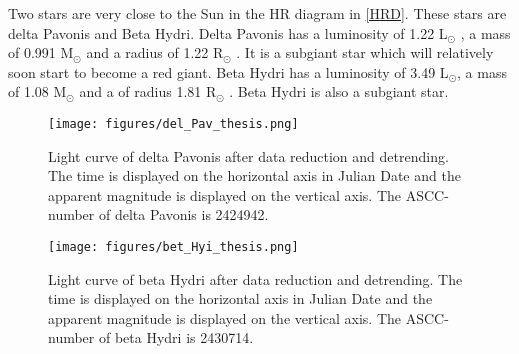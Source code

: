 \documentclass{aa}
\begin{document}


Two stars are very close to the Sun in the HR diagram in \ref{HRD}. These stars are delta Pavonis and Beta Hydri. Delta Pavonis has a luminosity of 1.22 L$_\odot$ \citep{Bruntt_2010}, a mass of 0.991 M$_\odot$ and a radius of 1.22 R$_\odot$ \citep{2008yCat..21680297T}. It is a subgiant star which will relatively soon start to become a red giant. Beta Hydri has a luminosity of 3.49 L$_\odot$, a mass of 1.08 M$_\odot$ and a of radius 1.81 R$_\odot$ \citep{Brand_o_2011}. Beta Hydri is also a subgiant star. 

\begin{figure}
    \centering
    \texttt{[image: figures/del\_Pav\_thesis.png]}
    \caption{Light curve of delta Pavonis after data reduction and detrending. The time is displayed on the horizontal axis in Julian Date and the apparent magnitude is displayed on the vertical axis. The ASCC-number of delta Pavonis is 2424942.}
    \label{del_Pav}
\end{figure}

\begin{figure}
    \centering
    \texttt{[image: figures/bet\_Hyi\_thesis.png]}
    \caption{Light curve of beta Hydri after data reduction and detrending. The time is displayed on the horizontal axis in Julian Date and the apparent magnitude is displayed on the vertical axis. The ASCC-number of beta Hydri is 2430714.}
    \label{bet_Hyi}
  \end{figure}
\end{document}
